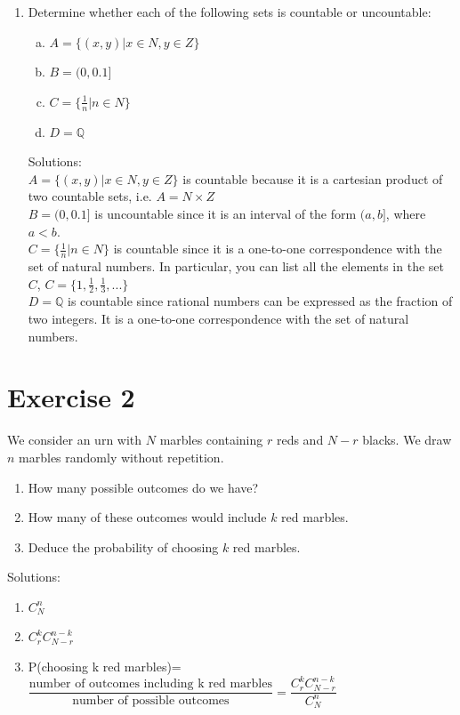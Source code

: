 \documentclass[12pt,thmsa]{article}
\begin{document}
\begin{enumerate}
\item Determine whether each of the following sets is countable or uncountable:
\begin{enumerate}[a)]
\item $ A=\{(x,y)|x \in N, y \in Z\} $
\item $ B=(0, 0.1] $
\item $ C=\{\frac{1}{n}|n \in N\} $
\item $ D=\mathbb{Q} $
\end{enumerate}

Solutions:\\
$ A=\{(x,y)|x \in N, y \in Z\} $ is countable because it is a cartesian product of two countable sets, i.e. $ A=N \times Z $\\
$ B=(0, 0.1] $ is uncountable since it is an interval of the form $ (a,b] $, where $ a < b $.\\
$ C=\{\frac{1}{n}|n \in N\} $ is countable since it is a one-to-one correspondence with the set of natural numbers. In particular, you can list all the elements in the set $C$, $ C=\{1, \frac{1}{2}, \frac{1}{3}, ...\} $\\
$ D=\mathbb{Q} $  is countable since rational numbers can be expressed as the fraction of two integers.  It is a one-to-one correspondence with the set of natural numbers.




\end{enumerate}

\section*{Exercise 2}


We consider an urn with $N$ marbles containing $r$ reds and $N-r$ blacks. We draw $n$ marbles randomly without repetition.
\begin{enumerate}
  \item How many possible outcomes do we have?
  \item How many of these outcomes would include $k$ red marbles.
  \item Deduce the probability of choosing $k$ red marbles.
\end{enumerate}

Solutions:
\begin{enumerate}
\item $C^{n}_{N}$
\item $C^{k}_{r} C^{n-k}_{N-r}$
\item P(choosing k red marbles)=$\dfrac{\text{number of outcomes including k red marbles}}{\text{number of possible outcomes}}=\dfrac{C^{k}_{r} C^{n-k}_{N-r}}{C^{n}_{N}}$
\end{enumerate}
\end{document}
